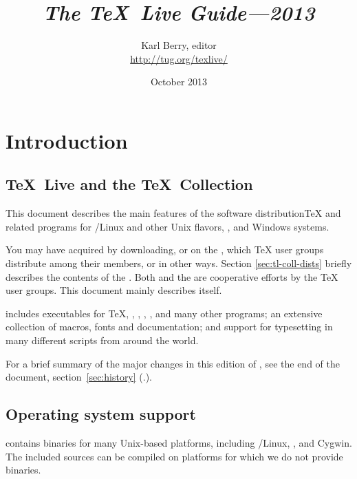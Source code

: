 \documentclass{article}
\begin{document}
\title{%
  {\huge \textit{The \TeX\ Live Guide---2013}}
}

\author{Karl Berry, editor \\[3mm]
        \url{http://tug.org/texlive/}
       }

\date{October 2013}

\maketitle

\begin{multicols}{2}
\tableofcontents
\end{multicols}

\section{Introduction}
\label{sec:intro}

\subsection{\TeX\ Live and the \TeX\ Collection}

This document describes the main features of the \TL{} software
distribution\Dash \TeX{} and related programs for \GNU/Linux
and other Unix flavors, \MacOSX, and Windows systems.

You may have acquired \TL{} by downloading, or on the \TK{} \DVD, which
\TeX{} user groups distribute among their members, or in other ways.
Section \ref{sec:tl-coll-dists} briefly describes the contents of the
\DVD.  Both \TL{} and the \TK{} are cooperative efforts by the \TeX{}
user groups. This document mainly describes \TL{} itself.

\TL{} includes executables for \TeX{}, \LaTeXe{}, \ConTeXt,
\MF, \MP, \BibTeX{} and many other programs; an extensive collection
of macros, fonts and documentation; and support for typesetting in
many different scripts from around the world.

For a brief summary of the major changes in this edition of \TL{},
see the end of the document, section~\ref{sec:history}
(\p.\pageref{sec:history}).


\subsection{Operating system support}
\label{sec:os-support}

\TL{} contains binaries for many Unix-based platforms, including
\GNU/Linux, \MacOSX, and Cygwin.  The included sources can be compiled
on platforms for which we do not provide binaries.
\end{document}
